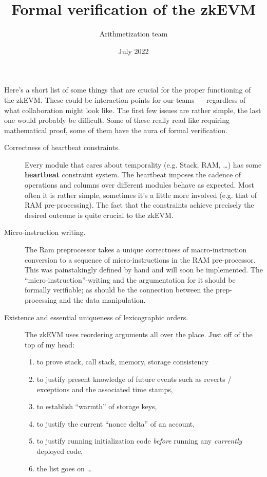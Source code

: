 \documentclass{article}
\title{Formal verification of the zkEVM}
\author{Arithmetization team}
\date{July 2022}
\begin{document}
\maketitle
\tableofcontents

Here's a short list of some things that are crucial for the proper functioning of the zkEVM. These could be interaction points for our teams --- regardless of what collaboration might look like. The first few issues are rather simple, the last one would probably be difficult. Some of these really read like requiring mathematical proof, some of them have the aura of formal verification.
\begin{description}
	\item[Correctness of heartbeat constraints.] Every module that cares about temporality (e.g. Stack, RAM, \dots{}) has some \textbf{heartbeat} constraint system. The heartbeat imposes the cadence of operations and columns over different modules behave as expected. Most often it is rather simple, sometimes it's a little more involved (e.g. that of RAM pre-processing). The fact that the constraints achieve precisely the desired outcome is quite crucial to the zkEVM.
	\item[Micro-instruction writing.] The Ram preprocessor takes a unique correctness of macro-instruction conversion to a sequence of micro-instructions in the RAM pre-processor. This was painstakingly defined by hand and will soon be implemented. The ``micro-instruction''-writing and the argumentation for it should be formally verifiable; as should be the connection between the prep-processing and the data manipulation. 
	\item[Existence and essential uniqueness of lexicographic orders.] The zkEVM uses reordering arguments all over the place. Just off of the top of my head:
	\begin{enumerate}
		\item to prove stack, call stack, memory, storage consistency
		\item to justify present knowledge of future events such as reverts / exceptions and the associated time stamps,
		\item to establish ``warmth'' of storage keys,
		\item to justify the current ``nonce delta'' of an account,
		\item to justify running initialization code \emph{before} running any \emph{currently} deployed code,
		\item the list goes on \dots{}
	\end{enumerate}

\end{description}
\end{document}
